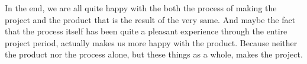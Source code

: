 In the end, we are all quite happy with the both the process of making the project and the product that is the result of the very same. And maybe the fact that the process itself has been quite a pleasant experience through the entire project period, actually makes us more happy with the product. Because neither the product nor the process alone, but these things as a whole, makes the project.